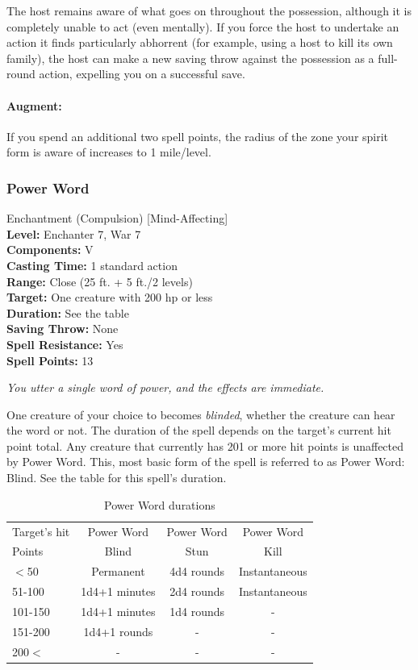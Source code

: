 The host remains aware of what goes on throughout the possession, although it is completely unable to act (even mentally).
If you force the host to undertake an action it finds particularly abhorrent (for example, using a host to kill its own family),
the host can make a new saving throw against the possession as a full-round action, expelling you on a successful save.

\paragraph{Augment:} If you spend an additional two spell points, the radius of the zone your spirit form is aware of increases to 1 mile/level.
\subsubsection{Power Word}
\label{Spell:PowerWord}
Enchantment (Compulsion) [Mind-Affecting]
\\ \textbf{Level:} Enchanter 7, War 7
\\ \textbf{Components:} V
\\ \textbf{Casting Time:} 1 standard action
\\ \textbf{Range:} Close (25 ft. + 5 ft./2 levels)
\\ \textbf{Target:} One creature with 200 hp or less
\\ \textbf{Duration:} See the  table
\\ \textbf{Saving Throw:} None
\\ \textbf{Spell Resistance:} Yes
\\ \textbf{Spell Points:} 13

\emph{You utter a single word of power, and the effects are immediate.} 

One creature of your choice to becomes \emph{blinded}, whether the creature can hear the word or not. 
The duration of the spell depends on the target's current hit point total. Any creature that currently has 201 or more hit points is unaffected by Power Word.
This, most basic form of the spell is referred to as Power Word: Blind. See the  table for this spell's duration.

\begin{table}
\label{tab:PowerWord}
\caption{Power Word durations}
\begin{center}
\begin{tabular}{|l|c|c|c|}
\hline
Target's hit&Power Word&Power Word&Power Word\\
Points&Blind&Stun&Kill\\
\hline
$<$50&Permanent&4d4 rounds&Instantaneous\\
51-100&1d4+1 minutes&2d4 rounds&Instantaneous\\
101-150&1d4+1 minutes&1d4 rounds&-\\
151-200&1d4+1 rounds&-&-\\
200$<$&-&-&-\\
\hline
\end{tabular}
\end{center}
\end{table}

